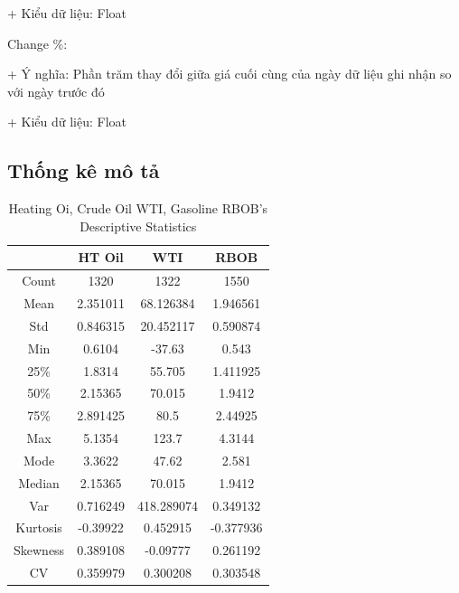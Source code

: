 \documentclass[conference]{IEEEtran}
\begin{document}
+ Kiểu dữ liệu: Float

Change \%:

+ Ý nghĩa: Phần trăm thay đổi giữa giá cuối cùng của ngày dữ liệu ghi nhận so với ngày trước đó

+ Kiểu dữ liệu: Float

\subsection{Thống kê mô tả}
\begin{table}[H]
  \centering
  \caption{Heating Oi, Crude Oil WTI, Gasoline RBOB’s Descriptive Statistics}
\begin{tabular}{|>{\columncolor{red!20}}c|c|c|c|}
    \hline
     \rowcolor{red!20} & HT Oil& WTI& RBOB\\ \hline
     Count & 1320
& 1322
& 1550
\\ \hline
     Mean & 2.351011
& 68.126384
& 1.946561
\\ \hline
     Std & 0.846315
& 20.452117
& 0.590874
\\ \hline
     Min & 0.6104
& -37.63
& 0.543
\\ \hline
     25\% & 1.8314
& 55.705
& 1.411925
\\ \hline
     50\% & 2.15365
& 70.015
& 1.9412
\\ \hline
     75\% & 2.891425
& 80.5
& 2.44925
\\ \hline
     Max & 5.1354
& 123.7
& 4.3144
\\ \hline
 Mode& 3.3622
& 47.62
&2.581
\\\hline
 Median& 2.15365
& 70.015
&1.9412
\\\hline
 Var& 0.716249
& 418.289074
&0.349132
\\\hline
 Kurtosis& -0.39922
& 0.452915
&-0.377936
\\\hline
 Skewness& 0.389108
& -0.09777
&0.261192
\\\hline
 CV& 0.359979
& 0.300208
&0.303548
\\\hline
\end{tabular}
\end{table}
\end{document}
